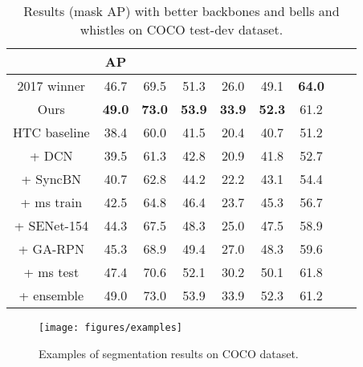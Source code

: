 \documentclass[10pt,twocolumn,letterpaper]{article}
\begin{document}
\begin{table}[htb]
	\centering
	\caption{Results (mask AP) with better backbones and bells and whistles on COCO test-dev dataset.}
	\addtolength{\tabcolsep}{-2pt}
	\begin{tabular}{*{9}{c}}
		\toprule
		                              & AP            &  &  &  &  &  \\
		\midrule
		2017 winner \cite{liu2018path} & 46.7          & 69.5             & 51.3             & 26.0            & 49.1            & \textbf{64.0}   \\
		Ours                          & \textbf{49.0} & \textbf{73.0}    & \textbf{53.9}    & \textbf{33.9}   & \textbf{52.3}   & 61.2            \\
		\midrule
		HTC baseline                  & 38.4          & 60.0             & 41.5             & 20.4            & 40.7            & 51.2            \\
		+ DCN                         & 39.5          & 61.3             & 42.8             & 20.9            & 41.8            & 52.7            \\
		+ SyncBN                      & 40.7          & 62.8             & 44.2             & 22.2            & 43.1            & 54.4            \\
		+ ms train                    & 42.5          & 64.8             & 46.4             & 23.7            & 45.3            & 56.7            \\
		+ SENet-154                   & 44.3          & 67.5             & 48.3             & 25.0            & 47.5            & 58.9            \\
		+ GA-RPN                      & 45.3          & 68.9             & 49.4             & 27.0            & 48.3            & 59.6            \\
		+ ms test                     & 47.4          & 70.6             & 52.1             & 30.2            & 50.1            & 61.8            \\
		+ ensemble                    & 49.0          & 73.0             & 53.9             & 33.9            & 52.3            & 61.2            \\
		\bottomrule
	\end{tabular}
	\vspace{-0.3cm}
	\label{tab:challenge-results}
\end{table}

\begin{figure*}
	\centering
	\texttt{[image: figures/examples]}
	\caption{Examples of segmentation results on COCO dataset.}
	\vspace{-0.3cm}
	\label{fig:examples}
\end{figure*}
\end{document}
